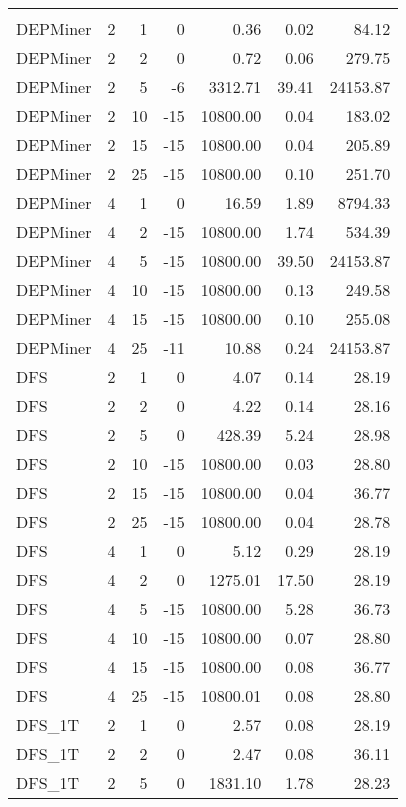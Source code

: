 \begin{center}
\begin{longtable}{lrrrrrr}
\hline\endlastfoot
\\
DEPMiner     & 2 & 1 &   0 & 0.36 & 0.02 & 84.12 \\ 
  DEPMiner     & 2 & 2 &   0 & 0.72 & 0.06 & 279.75 \\ 
  DEPMiner     & 2 & 5 &  -6 & 3312.71 & 39.41 & 24153.87 \\ 
  DEPMiner     & 2 & 10 & -15 & 10800.00 & 0.04 & 183.02 \\ 
  DEPMiner     & 2 & 15 & -15 & 10800.00 & 0.04 & 205.89 \\ 
  DEPMiner     & 2 & 25 & -15 & 10800.00 & 0.10 & 251.70 \\ 
  DEPMiner     & 4 & 1 &   0 & 16.59 & 1.89 & 8794.33 \\ 
  DEPMiner     & 4 & 2 & -15 & 10800.00 & 1.74 & 534.39 \\ 
  DEPMiner     & 4 & 5 & -15 & 10800.00 & 39.50 & 24153.87 \\ 
  DEPMiner     & 4 & 10 & -15 & 10800.00 & 0.13 & 249.58 \\ 
  DEPMiner     & 4 & 15 & -15 & 10800.00 & 0.10 & 255.08 \\ 
  DEPMiner     & 4 & 25 & -11 & 10.88 & 0.24 & 24153.87 \\ 
  DFS     & 2 & 1 &   0 & 4.07 & 0.14 & 28.19 \\ 
  DFS     & 2 & 2 &   0 & 4.22 & 0.14 & 28.16 \\ 
  DFS     & 2 & 5 &   0 & 428.39 & 5.24 & 28.98 \\ 
  DFS     & 2 & 10 & -15 & 10800.00 & 0.03 & 28.80 \\ 
  DFS     & 2 & 15 & -15 & 10800.00 & 0.04 & 36.77 \\ 
  DFS     & 2 & 25 & -15 & 10800.00 & 0.04 & 28.78 \\ 
  DFS     & 4 & 1 &   0 & 5.12 & 0.29 & 28.19 \\ 
  DFS     & 4 & 2 &   0 & 1275.01 & 17.50 & 28.19 \\ 
  DFS     & 4 & 5 & -15 & 10800.00 & 5.28 & 36.73 \\ 
  DFS     & 4 & 10 & -15 & 10800.00 & 0.07 & 28.80 \\ 
  DFS     & 4 & 15 & -15 & 10800.00 & 0.08 & 36.77 \\ 
  DFS     & 4 & 25 & -15 & 10800.01 & 0.08 & 28.80 \\ 
  DFS\_1T     & 2 & 1 &   0 & 2.57 & 0.08 & 28.19 \\ 
  DFS\_1T     & 2 & 2 &   0 & 2.47 & 0.08 & 36.11 \\ 
  DFS\_1T     & 2 & 5 &   0 & 1831.10 & 1.78 & 28.23 \\ 

\end{longtable}
\end{center}
